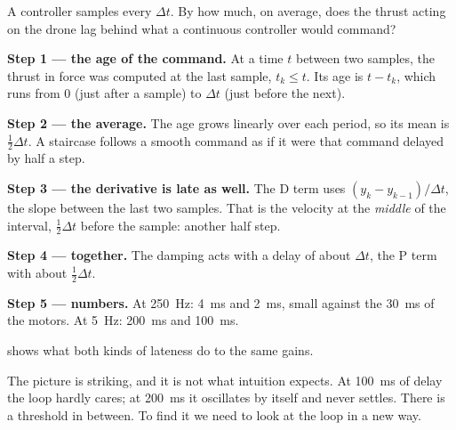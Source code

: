 \begin{example}
\label{ex:slow-zoh}
A controller samples every $\Delta t$. By how much, on average, does the thrust acting on the drone lag behind what a continuous controller would command?

\textbf{Step 1 — the age of the command.} At a time $t$ between two samples, the thrust in force was computed at the last sample, $t_k \le t$. Its age is $t - t_k$, which runs from 0 (just after a sample) to $\Delta t$ (just before the next).

\textbf{Step 2 — the average.} The age grows linearly over each period, so its mean is $\tfrac12\Delta t$. A staircase follows a smooth command as if it were that command delayed by half a step.

\textbf{Step 3 — the derivative is late as well.} The D term uses $(y_k - y_{k-1})/\Delta t$, the slope between the last two samples. That is the velocity at the \emph{middle} of the interval, $\tfrac12\Delta t$ before the sample: another half step.

\textbf{Step 4 — together.} The damping acts with a delay of about $\Delta t$, the P term with about $\tfrac12\Delta t$.

\textbf{Step 5 — numbers.} At \SI{250}{Hz}: \SI{4}{ms} and \SI{2}{ms}, small against the \SI{30}{ms} of the motors. At \SI{5}{Hz}: \SI{200}{ms} and \SI{100}{ms}.
\end{example}

 shows what both kinds of lateness do to the same gains.


The picture is striking, and it is not what intuition expects. At \SI{100}{ms} of delay the loop hardly cares; at \SI{200}{ms} it oscillates by itself and never settles. There is a threshold in between. To find it we need to look at the loop in a new way.

